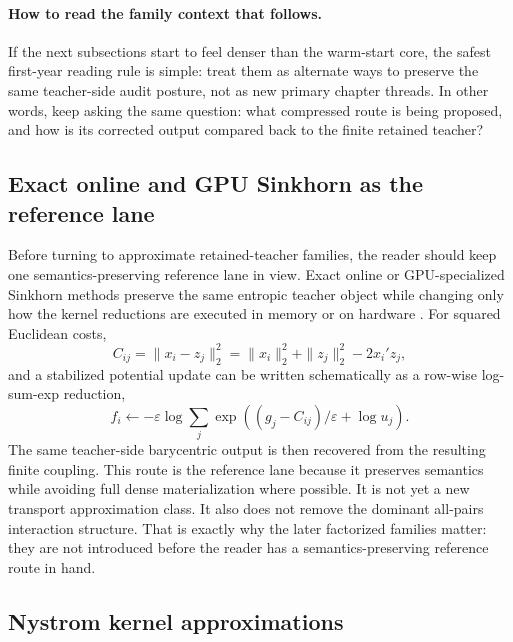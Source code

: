 \paragraph{How to read the family context that follows.}
If the next subsections start to feel denser than the warm-start core, the safest
first-year reading rule is simple: treat them as alternate ways to preserve the same
teacher-side audit posture, not as new primary chapter threads.  In other words,
keep asking the same question: what compressed route is being proposed, and how is
its corrected output compared back to the finite retained teacher?

\subsection{Exact online and GPU Sinkhorn as the reference lane}
\label{sec:bf-learned-ot-reference-lane}

Before turning to approximate retained-teacher families, the reader should keep one
semantics-preserving reference lane in view.  Exact online or GPU-specialized
Sinkhorn methods preserve the same entropic teacher object while changing only how
the kernel reductions are executed in memory or on hardware
\citep{feydy2019geomloss,charlier2021keops,ye2026flashsinkhorn,xiao2026fastsinkhorn}.
For squared Euclidean costs,
\begin{equation}
\label{eq:bf-learned-ot-reference-sqeuclidean}
  C_{ij}
  =
  \|x_i-z_j\|_2^2
  =
  \|x_i\|_2^2+\|z_j\|_2^2-2x_i'z_j,
\end{equation}
and a stabilized potential update can be written schematically as a row-wise
log-sum-exp reduction,
\begin{equation}
\label{eq:bf-learned-ot-reference-logupdate}
  f_i
  \leftarrow
  -\varepsilon\log\sum_j
  \exp\left((g_j-C_{ij})/\varepsilon+\log u_j\right).
\end{equation}
The same teacher-side barycentric output is then recovered from the resulting finite
coupling.  This route is the reference lane because it preserves semantics while
avoiding full dense materialization where possible.  It is not yet a new transport
approximation class.  It also does not remove the dominant all-pairs interaction
structure.  That is exactly why the later factorized families matter: they are not
introduced before the reader has a semantics-preserving reference route in hand.

\subsection{Nystrom kernel approximations}
\label{sec:bf-learned-ot-nystrom}

